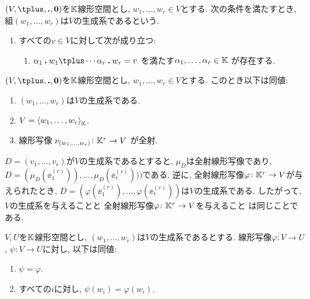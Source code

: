 \begin{definition}
  $(V,\plus,\act,\zzero)$を$\mathbb{K}$線形空間とし,
  $w_1,\ldots,w_r\in V$とする.
  次の条件を満たすとき,
  組$(w_1,\ldots,w_r)$は$V$の生成系であるという.
  \begin{enumerate}
  \item
    すべての$v\in V$に対して次が成り立つ:
    \begin{enumerate}
    \item
    $\alpha_1\act w_1\plus \cdots \alpha_r\act w_r=v$
    を満たす$\alpha_1,\ldots,\alpha_r\in\mathbb{K}$ が存在する.
    \end{enumerate}
  \end{enumerate}
\end{definition}
\begin{prop}
  $(V,\plus,\act,\zzero)$を$\mathbb{K}$線形空間とし,
  $w_1,\ldots,w_r\in V$とする.
  このとき以下は同値:
  \begin{enumerate}
  \item $(w_1,\ldots,w_r)$は$V$の生成系である.
  \item $V=\Braket{w_1,\ldots,w_r}_{\mathbb{K}}$.
  \item 線形写像 $\nu_{(w_1,\ldots,w_r)}\colon \mathbb{K}^r \to V$
    が全射.
  \end{enumerate}
\end{prop}
\begin{remark}
  $D=(v_1,\ldots,v_r)$が$V$の生成系であるとすると,
  $\mu_D$は全射線形写像であり,
  $D=(\mu_D(\ee^{(r)}_1)),\ldots,\mu_D(\ee^{(r)}_r)))$である.
  逆に, 全射線形写像$\varphi\colon \mathbb{K}^r\to V$が与えられたとき,
  $D=(\varphi(\ee^{(r)}_1),\ldots,\varphi(\ee^{(r)}_r))$は$V$の生成系である.
  したがって,
  $V$の生成系を与えることと
  全射線形写像$\varphi\colon \mathbb{K}^r\to V$を与えること
  は同じことである.
\end{remark}

\begin{prop}
  $V, U$を$\mathbb{K}$線形空間とし,
  $(w_1,\ldots,w_r)$は$V$の生成系であるとする.
  線形写像$\varphi\colon V\to U$,
  $\psi\colon V\to U$に対し,
  以下は同値:
  \begin{enumerate}
  \item $\psi=\varphi$.
  \item すべての$i$に対し,  $\psi(w_i)=\varphi(w_i)$.
  \end{enumerate}
\end{prop}



